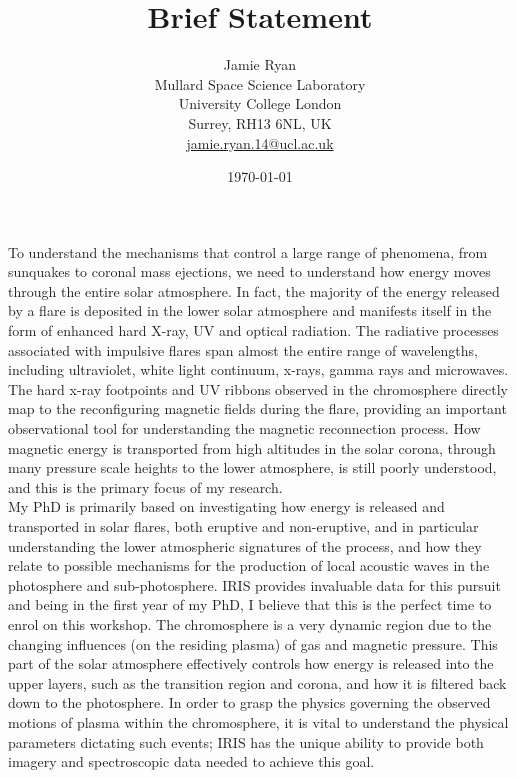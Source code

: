 \documentclass[10pt]{article}
\begin{document}
\title{Brief Statement}
\author{Jamie Ryan \\ 
Mullard Space Science Laboratory \\
University College London \\
Surrey, RH13 6NL, UK\\
\href{mailto:jamie.ryan.14@ucl.ac.uk}{jamie.ryan.14@ucl.ac.uk} \\
\date{\today}
}
\maketitle



To understand the mechanisms that control a large range of phenomena, from sunquakes to coronal mass ejections, we need to understand how energy moves through the entire solar atmosphere. In fact, the majority of the energy released by a flare is deposited in the lower solar atmosphere and manifests itself in the form of enhanced hard X-ray, UV and optical radiation. The radiative processes associated with impulsive flares span almost the entire range of wavelengths, including ultraviolet, white light continuum, x-rays, gamma rays and microwaves. The hard x-ray footpoints and UV ribbons observed in the chromosphere directly map to the reconfiguring magnetic fields during the flare, providing an important observational tool for understanding the magnetic reconnection process. How magnetic energy is transported from high altitudes in the solar corona, through many pressure scale heights to the lower atmosphere, is still poorly understood, and this is the primary focus of my research. \\

My PhD is primarily based on investigating how energy is released and transported in solar flares, both eruptive and non-eruptive, and in particular understanding the lower atmospheric signatures of the process, and how they relate to possible mechanisms for the production of local acoustic waves in the photosphere and sub-photosphere. IRIS provides invaluable data for this pursuit and being in the first year of my PhD, I believe that this is the perfect time to enrol on this workshop. The chromosphere is a very dynamic region due to the changing influences (on the residing plasma) of gas and magnetic pressure. This part of the solar atmosphere effectively controls how energy is released into the upper layers, such as the transition region and corona, and how it is filtered back down to the photosphere. In order to grasp the physics governing the observed motions of plasma within the chromosphere, it is vital to understand the physical parameters dictating such events; IRIS has the unique ability to provide both imagery and spectroscopic data needed to achieve this goal. \\
\end{document}
